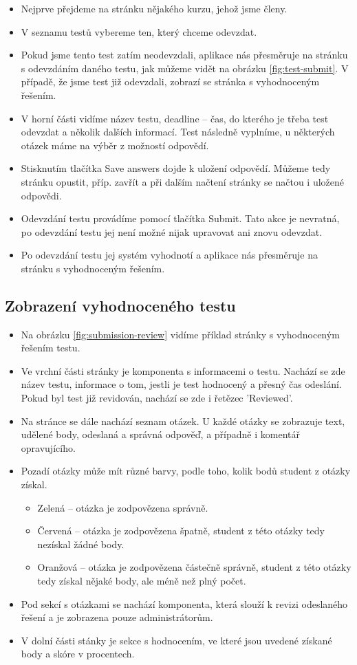 \begin{itemize}
	\item Nejprve přejdeme na stránku nějakého kurzu, jehož jsme členy.
	\item V seznamu testů vybereme ten, který chceme odevzdat.
	\item Pokud jsme tento test zatím neodevzdali, aplikace nás přesměruje na stránku s odevzdáním daného testu, jak můžeme vidět na obrázku \ref{fig:test-submit}. V případě, že jsme test již odevzdali, zobrazí se stránka s vyhodnoceným řešením.
	\item V horní části vidíme název testu, deadline -- čas, do kterého je třeba test odevzdat a několik dalších informací. Test následně vyplníme, u některých otázek máme na výběr z možností odpovědí.
	\item Stisknutím tlačítka Save answers dojde k uložení odpovědí. Můžeme tedy stránku opustit, příp. zavřít a při dalším načtení stránky se načtou i uložené odpovědi.
	\item Odevzdání testu provádíme pomocí tlačítka Submit. Tato akce je nevratná, po odevzdání testu jej není možné nijak upravovat ani znovu odevzdat.
	\item Po odevzdání testu jej systém vyhodnotí a aplikace nás přesměruje na stránku s vyhodnoceným řešením.
\end{itemize}

\subsection{Zobrazení vyhodnoceného testu}

\begin{itemize}
	\item Na obrázku \ref{fig:submission-review} vidíme příklad stránky s vyhodnoceným řešením testu.
	\item Ve vrchní části stránky je komponenta s informacemi o testu. Nachází se zde název testu, informace o tom, jestli je test hodnocený a přesný čas odeslání. Pokud byl test již revidován, nachází se zde i řetězec 'Reviewed'. 
	\item Na stránce se dále nachází seznam otázek. U každé otázky se zobrazuje text, udělené body, odeslaná a správná odpověď, a případně i komentář opravujícího.
	\item Pozadí otázky může mít různé barvy, podle toho, kolik bodů student z otázky získal.
		\begin{itemize}
			\item Zelená -- otázka je zodpovězena správně.
			\item Červená -- otázka je zodpovězena špatně, student z této otázky tedy nezískal žádné body.
			\item Oranžová -- otázka je zodpovězena částečně správně, student z této otázky tedy získal nějaké body, ale méně než plný počet.
		\end{itemize}
	\item Pod sekcí s otázkami se nachází komponenta, která slouží k revizi odeslaného řešení a je zobrazena pouze administrátorům.
	\item V dolní části stánky je sekce s hodnocením, ve které jsou uvedené získané body a skóre v procentech.
\end{itemize}

